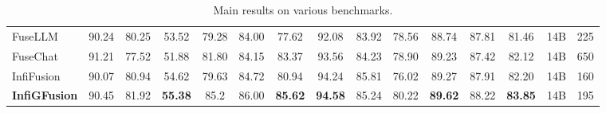 \documentclass{article}
\begin{document}
\begin{table}[t]
{\begin{tabular}{l ccc cc ccc c cc c cc}
FuseLLM &90.24 	&80.25 	&53.52 	&79.28 	&84.00 	&77.62 	&92.08 	&83.92 	&78.56 	&88.74 	&87.81 	&81.46 & 14B & 225\\
FuseChat & 91.21	&77.52	&51.88	&81.80	&84.15	&83.37	&93.56	&84.23	&78.90	&89.23	&87.42	&82.12 & 14B & 650\\
InfiFusion & 90.07 & 80.94 & 54.62 & 79.63 & 84.72 & 80.94 & {94.24} & 85.81 & 76.02 & 89.27 & 87.91 & 82.20 & 14B & 160\\
\midrule
\rowcolor{blue!10}
\textbf{InfiGFusion} & 90.45 & 81.92 & \textbf{55.38}	& 85.2	& 86.00	& \textbf{85.62}	& \textbf{94.58}	& 85.24	& 80.22	& \textbf{89.62}	& 88.22	& \textbf{83.85}  & 14B & 195\\
\bottomrule
\end{tabular}}
\caption{\small Main results on various benchmarks.}
\label{tab:main_res}
\vspace{-3mm}
\end{table}

\end{document}
